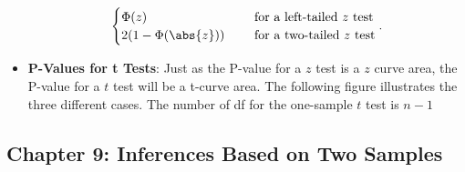 \documentclass{report}
\begin{document}
\begin{itemize}
\begin{align*}
\begin{cases}
                     \Phi(z) & \quad \text{ for a left-tailed $z$ test}  \\
                     2(1-\Phi(\abs{z})) & \quad \text{ for a two-tailed $z$ test}  
                \end{cases}
            .\end{align*}
            \bigbreak \noindent 
        \item \textbf{P-Values for t Tests}:
            Just as the P-value for a $z$ test is a $z$ curve area, the P-value for a $t$ test will be a t-curve area. The following figure illustrates the three different cases. The number of df for the one-sample $t$ test is $n-1$
            \bigbreak \noindent 
    \end{itemize}

    \pagebreak 
    \subsection{Chapter 9: Inferences Based on Two Samples}
    \bigbreak \noindent 
\end{document}
